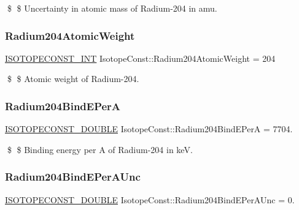 \$ \$ Uncertainty in atomic mass of Radium-\/204 in amu. \mbox{\label{group___isotope_const-_radium-_ra204_ga61e99624f90c397afb98f63d091953a2}} 
\subsubsection{\texorpdfstring{Radium204\+Atomic\+Weight}{Radium204AtomicWeight}}
{\footnotesize\ttfamily \mbox{\hyperlink{group___isotope_const-_macros_ga5f18360b3e99483a35c32d789e62621c}{I\+S\+O\+T\+O\+P\+E\+C\+O\+N\+S\+T\+\_\+\+I\+NT}} Isotope\+Const\+::\+Radium204\+Atomic\+Weight = 204}

\$ \$ Atomic weight of Radium-\/204. \mbox{\label{group___isotope_const-_radium-_ra204_ga7eb652d51a677b86bf38b6b78d10f757}} 
\subsubsection{\texorpdfstring{Radium204\+Bind\+E\+PerA}{Radium204BindEPerA}}
{\footnotesize\ttfamily \mbox{\hyperlink{group___isotope_const-_macros_ga8f45a7272ce02c0b4c65c44636ed719a}{I\+S\+O\+T\+O\+P\+E\+C\+O\+N\+S\+T\+\_\+\+D\+O\+U\+B\+LE}} Isotope\+Const\+::\+Radium204\+Bind\+E\+PerA = 7704.}

\$ \$ Binding energy per A of Radium-\/204 in keV. \mbox{\label{group___isotope_const-_radium-_ra204_ga2494b745ffaab5f8ee74c9ddf94ab924}} 
\subsubsection{\texorpdfstring{Radium204\+Bind\+E\+Per\+A\+Unc}{Radium204BindEPerAUnc}}
{\footnotesize\ttfamily \mbox{\hyperlink{group___isotope_const-_macros_ga8f45a7272ce02c0b4c65c44636ed719a}{I\+S\+O\+T\+O\+P\+E\+C\+O\+N\+S\+T\+\_\+\+D\+O\+U\+B\+LE}} Isotope\+Const\+::\+Radium204\+Bind\+E\+Per\+A\+Unc = 0.}

